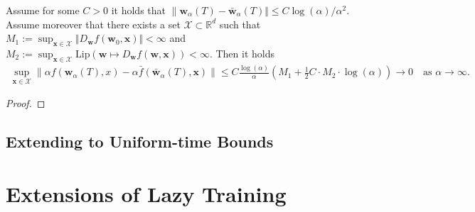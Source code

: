 \documentclass{article}
\newenvironment{manualproposition}[1]{%
  \renewcommand\themanualpropositioninner{#1}%
  \manualpropositioninner
}{\endmanualtheoreminner}
\begin{document}
\begin{manualproposition}{A.1}\label{generalization}
Assume for some $C > 0$ it holds that $\| \boldsymbol{w}_{\alpha}(T) - \boldsymbol{\bar{w}}_{\alpha}(T) \Vert \leq C\log(\alpha)/\alpha^2$. Assume moreover that there exists a set $\mathcal{X} \subset \mathbb{R}^d$ such that $M_1 := \sup_{\boldsymbol{x} \in \mathcal{X}} \Vert D_{\boldsymbol{w}}f(\boldsymbol{w}_0, \boldsymbol{x}) \Vert < \infty$ and $M_2 := \sup_{\boldsymbol{x} \in \mathcal{X}} \text{Lip}( \boldsymbol{w} \mapsto D_{\boldsymbol{w}}f(\boldsymbol{w}, \boldsymbol{x})) < \infty$. Then it holds 
\begin{align*}
    \sup_{\boldsymbol{x} \in \mathcal{X}} \| \alpha f(\boldsymbol{w}_{\alpha}(T), x) - \alpha \bar{f}(\boldsymbol{\bar{w}}_{\alpha}(T), \boldsymbol{x}) \| \leq C \frac{\log(\alpha)}{\alpha}\left(M_1 + \frac{1}{2}C\cdot M_2 \cdot \log(\alpha) \right) \longrightarrow 0 \quad \text{as $\alpha \longrightarrow \infty$}.
\end{align*}
\end{manualproposition}

\begin{proof}
\end{proof}

\subsection{Extending to Uniform-time Bounds}

\section{Extensions of Lazy Training}\label{extensions}

\pagebreak


\end{document}
